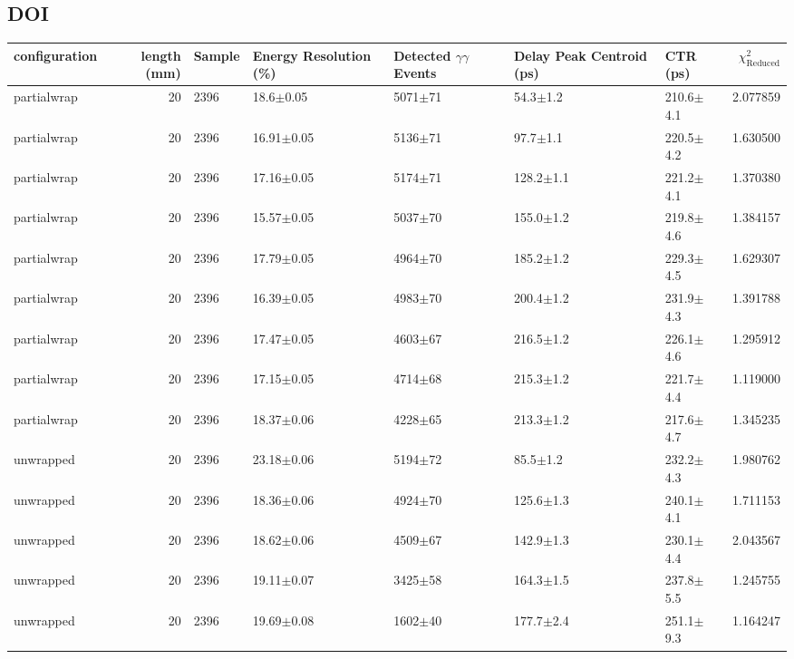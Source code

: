 \subsection{DOI}
\begin{tabular}{lrlllllr}
\hline
configuration &  length (mm) & Sample & Energy Resolution (\%) & Detected $\gamma\gamma$ Events & Delay Peak Centroid (ps) & CTR (ps) &  $\chi^2_\text{Reduced}$ \\
\hline
  partialwrap &      20 &    2396 &    18.6$\pm$0.05 &  5071$\pm$71 &    54.3$\pm$1.2 &   210.6$\pm$4.1 &    2.077859 \\
  partialwrap &      20 &    2396 &   16.91$\pm$0.05 &  5136$\pm$71 &    97.7$\pm$1.1 &   220.5$\pm$4.2 &    1.630500 \\
  partialwrap &      20 &    2396 &   17.16$\pm$0.05 &  5174$\pm$71 &   128.2$\pm$1.1 &   221.2$\pm$4.1 &    1.370380 \\
  partialwrap &      20 &    2396 &   15.57$\pm$0.05 &  5037$\pm$70 &   155.0$\pm$1.2 &   219.8$\pm$4.6 &    1.384157 \\
  partialwrap &      20 &    2396 &   17.79$\pm$0.05 &  4964$\pm$70 &   185.2$\pm$1.2 &   229.3$\pm$4.5 &    1.629307 \\
  partialwrap &      20 &    2396 &   16.39$\pm$0.05 &  4983$\pm$70 &   200.4$\pm$1.2 &   231.9$\pm$4.3 &    1.391788 \\
  partialwrap &      20 &    2396 &   17.47$\pm$0.05 &  4603$\pm$67 &   216.5$\pm$1.2 &   226.1$\pm$4.6 &    1.295912 \\
  partialwrap &      20 &    2396 &   17.15$\pm$0.05 &  4714$\pm$68 &   215.3$\pm$1.2 &   221.7$\pm$4.4 &    1.119000 \\
  partialwrap &      20 &    2396 &   18.37$\pm$0.06 &  4228$\pm$65 &   213.3$\pm$1.2 &   217.6$\pm$4.7 &    1.345235 \\
    unwrapped &      20 &    2396 &   23.18$\pm$0.06 &  5194$\pm$72 &    85.5$\pm$1.2 &   232.2$\pm$4.3 &    1.980762 \\
    unwrapped &      20 &    2396 &   18.36$\pm$0.06 &  4924$\pm$70 &   125.6$\pm$1.3 &   240.1$\pm$4.1 &    1.711153 \\
    unwrapped &      20 &    2396 &   18.62$\pm$0.06 &  4509$\pm$67 &   142.9$\pm$1.3 &   230.1$\pm$4.4 &    2.043567 \\
    unwrapped &      20 &    2396 &   19.11$\pm$0.07 &  3425$\pm$58 &   164.3$\pm$1.5 &   237.8$\pm$5.5 &    1.245755 \\
    unwrapped &      20 &    2396 &   19.69$\pm$0.08 &  1602$\pm$40 &   177.7$\pm$2.4 &   251.1$\pm$9.3 &    1.164247 \\

\end{tabular}
